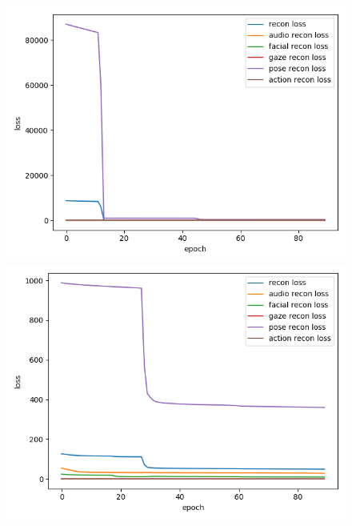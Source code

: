 \begin{figure}
    \centering
    \small
    \begin{minipage}[c]{0.48\linewidth}
    \centering
    \includegraphics[width=\textwidth]{images/results/multimodal_aligned_mfcc_hidden040_batch1024_epoch100_noise01_full.png}
    \end{minipage}
    \begin{minipage}[c]{0.48\linewidth}
    \centering
    \includegraphics[width=\textwidth]{images/results/multimodal_aligned_egemaps_hidden050_batch1024_epoch100_noise01_full.png}
    \end{minipage}
    \begin{minipage}[c]{0.48\linewidth}
    \centering

\end{minipage}
\end{figure}
